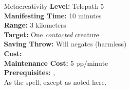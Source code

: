 {Metacreativity}
{
    \textbf{Level:}
    Telepath 5\\
    \textbf{Manifesting Time:}
    10 minutes\\
    \textbf{Range:}
    3 kilometers\\
    \textbf{Target:}
    One \emph{contacted} creature\\
    \textbf{Saving Throw:}
    Will negates (harmless)\\
    \textbf{Cost:}
    \\
    \textbf{Maintenance Cost:}
    5 pp/minute\\
    \textbf{Prerequisites:}
    , \\
}
{
    As the  spell, except as noted here.
}
